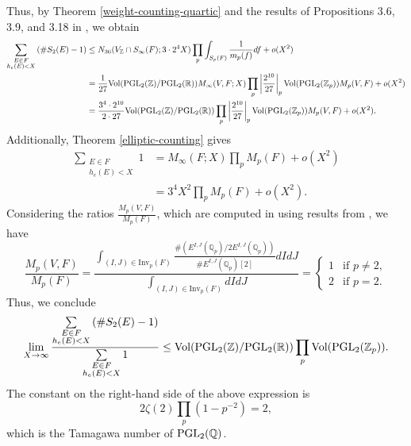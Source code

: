 \documentclass{article}
\def\Z{{\mathbb Z}}
\def\PGL{{\rm PGL}}
\def\Vol{{\rm Vol}}
\def\R{{\mathbb R}}
\def\Q{{\mathbb Q}}
\def\Z{{\mathbb Z}}
\def\Q{{\mathbb Q}}
\def \h{{\rm ht}}
\begin{document}
Thus, by Theorem \ref{weight-counting-quartic} and the results of Propositions 3.6, 3.9, and 3.18 in \cite{main}, we obtain  
\begin{align*}
        \sum_{\substack{E\in F\\h_e(E)<X}}\left(\#S_2(E)-1\right) 
        &\leq  N_{36}(V_{\Z}\cap S_{\infty}(F);3\cdot2^4X)\prod_{p} \int_{S_{p}(F)}\frac{1}{m_p(f)}df+o(X^2)\\
         &=  \frac{1}{27}\Vol(\PGL_2(\Z)/\PGL_2(\R)) M_{\infty}(V,F;X) \prod_{p} \left|\frac{2^{10}}{27}\right|_p \Vol(\PGL_2(\Z_p)) M_p(V,F)+o(X^2)\\
         &=\frac{3^4\cdot 2^{10}}{2\cdot27}  \Vol(\PGL_2(\Z)/\PGL_2(\R))\prod_{p} \left|\frac{2^{10}}{27}\right|_p \Vol(\PGL_2(\Z_p)) M_p(V,F)+o(X^2).
\end{align*} 
Additionally, Theorem \ref{elliptic-counting} gives  
\begin{align*}
\sum_{\substack{E\in F\\h_e(E)<X}}1 &=M_{\infty}(F;X) \prod_p M_p(F) + o(X^2)\\
&= 3^4X^2 \prod_p M_p(F) + o(X^2).
\end{align*}
Considering the ratios $\frac{M_{p}(V, F)}{M_{p}(F)}$, which are computed in \cite{main} using results from \cite{quotient}, we have  
\begin{equation*}
    \frac{M_p(V,F)}{M_p(F)}
    = \frac{\int_{(I,J) \in \text{Inv}_p(F)} \frac{\#(E^{I,J}(\mathbb{Q}_p)/2E^{I,J}(\mathbb{Q}_p))}{\#E^{I,J}(\mathbb{Q}_p)[2]} dI dJ}
    {\int_{(I,J) \in \text{Inv}_p(F)} dI dJ}
    =
    \begin{cases}
        1 & \text{if } p \neq 2, \\
        2 & \text{if } p = 2.
    \end{cases}
\end{equation*}
Thus, we conclude  
\begin{equation*}
 \lim_{X \to \infty} \frac{\sum\limits_{\substack{E\in F\\h_{e}(E)<X}}\left(\#S_2(E)-1\right)}{\sum\limits_{\substack{E\in F\\h_{e}(E)<X}}1} \leq \Vol(\PGL_2(\Z)/\PGL_2(\R))\prod_{p} \Vol(\PGL_2(\Z_p)).
\end{equation*}
The constant on the right-hand side of the above expression is  
\begin{equation*}
2\zeta(2)\prod_{p}(1-p^{-2})=2,
\end{equation*}
which is the Tamagawa number of $\PGL_2(\Q)$.
\end{document}
